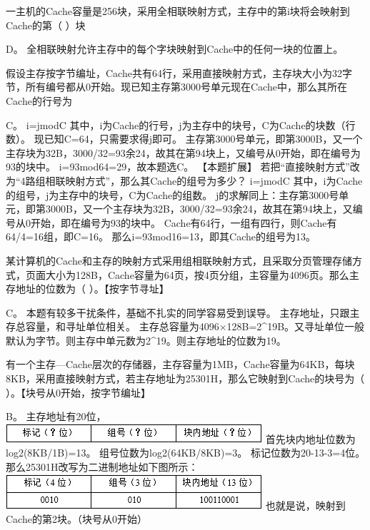 \question 一主机的Cache容量是256块，采用全相联映射方式，主存中的第i块将会映射到Cache的第（
）块
\par{}
\begin{solution}D。 全相联映射允许主存中的每个字块映射到Cache中的任何一块的位置上。
\end{solution}
\question 假设主存按字节编址，Cache共有64行，采用直接映射方式，主存块大小为32字节，所有编号都从0开始。现已知主存第3000号单元现在Cache中，那么其所在Cache的行号为
\par{}
\begin{solution}C。 i=jmodC
其中，i为Cache的行号，j为主存中的块号，C为Cache的块数（行数）。
现已知C=64，只需要求得j即可。
主存第3000号单元，即第3000B，又一个主存块为32B，3000/32=93余24，故其在第94块上，又编号从0开始，即在编号为93的块中。
i=93mod64=29，故本题选C。 【本题扩展】
若把``直接映射方式''改为``4路组相联映射方式''，那么其Cache的组号为多少？
i=jmodC 其中，i为Cache的组号，j为主存中的块号，C为Cache的组数。
j的求解同上：主存第3000号单元，即第3000B，又一个主存块为32B，3000/32=93余24，故其在第94块上，又编号从0开始，即在编号为93的块中。
Cache有64行，一组有四行，则Cache有64/4=16组，即C=16。
那么i=93mod16=13，即其Cache的组号为13。
\end{solution}
\question 某计算机的Cache和主存的映射方式采用组相联映射方式，且采取分页管理存储方式，页面大小为128B，Cache容量为64页，按4页分组，主容量为4096页。那么主存地址的位数为（
）。【按字节寻址】
\par{}
\begin{solution}C。 本题有较多干扰条件，基础不扎实的同学容易受到误导。
主存地址，只跟主存总容量，和寻址单位相关。
主存总容量为4096×128B=2\^{}19B。又寻址单位一般默认为字节。则主存中单元数为2\^{}19。则主存地址的位数为19。
\end{solution}
\question 有一个主存---Cache层次的存储器，主存容量为1MB，Cache容量为64KB，每块8KB，采用直接映射方式，若主存地址为25301H，那么它映射到Cache的块号为（
）。【块号从0开始，按字节编址】
\par{}
\begin{solution}B。 主存地址有20位，
\includegraphics[width=3.73958in,height=0.28125in]{computerassets/8897229bdfb39d439c35ffdad2d4769f.jpeg}
首先块内地址位数为log2(8KB/1B)=13。 组号位数为log2(64KB/8KB)=3。
标记位数为20-13-3=4位。 那么25301H改写为二进制地址如下图所示：
\includegraphics[width=3.73958in,height=0.51042in]{computerassets/d5c9ffa1a1c8153dee0b8c0ff80f238c.jpeg}
也就是说，映射到Cache的第2块。（块号从0开始）
\end{solution}
